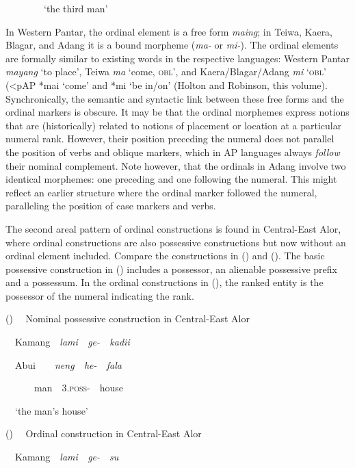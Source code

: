 \ \ \ \ \ \ \ \ {\textquoteleft}the third man{\textquoteright}

In Western Pantar, the ordinal element is a free form \textit{maing}; in Teiwa, Kaera, Blagar, and Adang it is a bound morpheme (\textit{ma- }or \textit{mi-}). The ordinal elements are formally similar to existing words in the respective languages: Western Pantar \textit{mayang }{\textquoteleft}to place{\textquoteright},\textit{ }Teiwa\textit{ ma }{\textquoteleft}come, \textsc{obl}{\textquoteright}, and Kaera/Blagar/Adang \textit{mi }{\textquoteleft}\textsc{obl{\textquoteright} (}{\textless}pAP *mai {\textquoteleft}come{\textquoteright} and *mi {\textquoteleft}be in/on{\textquoteright} (Holton and Robinson, this volume). Synchronically, the semantic and syntactic link between these free forms and the ordinal markers is obscure. It may be that the ordinal morphemes express notions that are (historically) related to notions of placement or location at a particular numeral rank. However, their position preceding the numeral does not parallel the position of verbs and oblique markers, which in AP languages 
always \textit{follow} their nominal complement. Note however, that the ordinals in Adang involve two identical morphemes: one preceding and one following the numeral. This might reflect an earlier structure where the ordinal marker followed the numeral, paralleling the position of case markers and verbs.

The second areal pattern of ordinal constructions is found in Central-East Alor, where ordinal constructions are also possessive constructions but now without an ordinal element included. Compare the constructions in () and (). The basic possessive construction in () includes a possessor, an alienable possessive prefix and a possessum. In the ordinal constructions in (), the ranked entity is the possessor of the numeral indicating the rank.

\label{bkm:Ref342649962}() \ \ Nominal possessive construction in Central-East Alor 

\ \ Kamang\ \ \textit{lami\ \ ge-\ \ kadii}

\ \ Abui\ \ \ \ \textit{neng\ \ he-\ \ fala}

\ \ \ \ \ \ man\ \ 3\textsc{.poss-\ \ }house

\ \ {\textquoteleft}the man{\textquoteright}s house{\textquoteright}

\label{bkm:Ref342309284}()  \ \ Ordinal construction in Central-East Alor

\ \ Kamang\ \ \textit{lami\ \ ge-}\ \ \textit{su}

